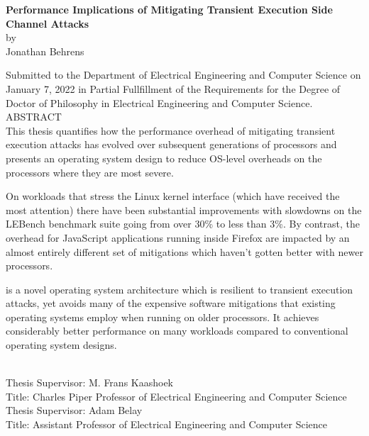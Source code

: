 
\singlespace
\begin{center}

{\large \bf Performance Implications of Mitigating Transient Execution Side Channel Attacks} \\[.5\baselineskip]
by \\
Jonathan Behrens \\[.5\baselineskip]
\end{center}

Submitted to the Department of Electrical Engineering and Computer Science on January 7, 2022 in Partial Fullfillment of the Requirements for the Degree of Doctor of Philosophy in Electrical Engineering and Computer Science.\\[.5\baselineskip]

\noindent
ABSTRACT \\

This thesis quantifies how the performance overhead of mitigating transient execution attacks has evolved over subsequent generations of processors and presents an operating system design to reduce OS-level overheads on the processors where they are most severe.  

On workloads that stress the Linux kernel interface (which have received the most attention) there have been substantial improvements with slowdowns on the LEBench benchmark suite going from over 30\% to less than 3\%.
By contrast, the overhead for JavaScript applications running inside Firefox are impacted by an almost entirely different set of mitigations which haven't gotten better with newer processors.

\sys is a novel operating system architecture which is resilient to transient execution attacks, yet avoids many of the expensive software mitigations that existing operating systems employ when running on older processors. 
It achieves considerably better performance on many workloads compared to conventional operating system designs.

~\\[\baselineskip]

\noindent
Thesis  Supervisor:  M.  Frans  Kaashoek \\
Title:  Charles  Piper  Professor  of Electrical  Engineering  and  Computer  Science \\[.5\baselineskip]
\noindent
Thesis  Supervisor:  Adam Belay \\
Title:  Assistant Professor  of Electrical  Engineering  and  Computer  Science \\

\doublespace